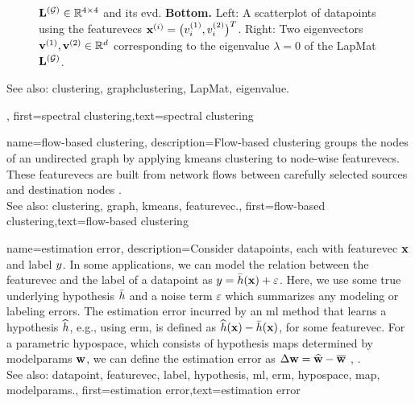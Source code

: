 {{\begin{figure}[H]
\begin{center}
{					${\bf L}^{(\mathcal{G})}  \in \mathbb{R}^{4 \times 4}$ and its \gls{evd}. 
					{\bf Bottom.} Left: A \gls{scatterplot} of \glspl{datapoint} using the \glspl{featurevec} 
					${\bf x}^{(i)} = \big( v^{(1)}_{i},v^{(2)}_{i} \big)^{T}$. 
					Right: Two \glspl{eigenvector} ${\bf v}^{(1)},{\bf v}^{(2)} \in \mathbb{R}^{d}$ 
					corresponding to the \gls{eigenvalue} $\lambda=0$ of the \gls{LapMat} ${\bf L}^{(\mathcal{G})}$. 
					} 
			\end{center}
		\end{figure}
		See also: \gls{clustering}, \gls{graphclustering},  \gls{LapMat}, \gls{eigenvalue}.
	\newpage}, 
	first={spectral clustering},text={spectral clustering} 
}

{name={flow-based clustering},
	description={Flow-based \gls{clustering} groups the nodes 
		of an undirected \gls{graph} by applying \gls{kmeans} \gls{clustering} to node-wise 
		\glspl{featurevec}. These \glspl{featurevec} are built from network flows between 
		carefully selected sources and destination nodes \cite{FlowSpecClustering2021}. 
					\\ 
		See also: \gls{clustering}, \gls{graph}, \gls{kmeans}, \gls{featurevec}.}, 
	first={flow-based clustering},text={flow-based clustering} 
}



{name={estimation error},
	description={Consider \glspl{datapoint}, each with \gls{featurevec} ${\bf x}$ and \gls{label} 
		$y$. In some applications, we can model the relation between the \gls{featurevec} and the \gls{label}
		of a \gls{datapoint} as $y = \bar{h}({\bf x}) + \varepsilon$. Here, we 
		use some true underlying \gls{hypothesis} $\bar{h}$ and a noise term $\varepsilon$ 
		which summarizes any modeling or labeling errors. The estimation error incurred by an \gls{ml} 
		method that learns a \gls{hypothesis} $\widehat{h}$, e.g., using \gls{erm}, is defined as 
		$\widehat{h}({\bf x}) - \bar{h}({\bf x})$, for some \gls{featurevec}. 
		For a parametric \gls{hypospace}, which consists of \gls{hypothesis} \glspl{map} determined by 
		\gls{modelparams} ${\bf w}$, we can define the estimation error as $\Delta {\bf w} = \widehat{{\bf w}} - \overline{{\bf w}}$ \cite{hastie01statisticallearning}, \cite{kay}.
					\\ 
		See also: \gls{datapoint}, \gls{featurevec}, \gls{label}, \gls{hypothesis}, \gls{ml}, \gls{erm}, \gls{hypospace}, \gls{map}, \gls{modelparams}.},
	first={estimation error},text={estimation error} 
}


